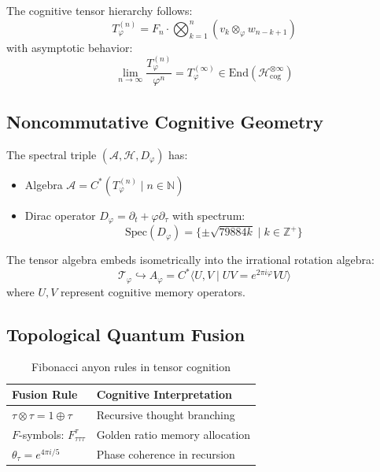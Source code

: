 \documentclass[12pt]{article}
\begin{document}
\begin{theorem}
The cognitive tensor hierarchy follows:
\[
T_\varphi^{(n)} = F_n \cdot \bigotimes_{k=1}^n \left(v_k \otimes_\varphi w_{n-k+1}\right)
\]
with asymptotic behavior:
\[
\lim_{n\to\infty} \frac{T_\varphi^{(n)}}{\varphi^n} = T_\varphi^{(\infty)} \in \text{End}(\mathcal{H}_{\text{cog}}^{\otimes \infty})
\]
\end{theorem}

\subsection{Noncommutative Cognitive Geometry}
The spectral triple $(\mathcal{A}, \mathcal{H}, D_\varphi)$ has:
\begin{itemize}
    \item Algebra $\mathcal{A} = C^*(T_\varphi^{(n)} \mid n \in \mathbb{N})$ 
    \item Dirac operator $D_\varphi = \partial_t + \varphi \partial_\tau$ with spectrum:
    \[
    \text{Spec}(D_\varphi) = \{ \pm \sqrt{79884k} \mid k \in \mathbb{Z}^+ \}
    \]
\end{itemize}

\begin{proposition}
The tensor algebra embeds isometrically into the irrational rotation algebra:
\[
\mathcal{T}_\varphi \hookrightarrow A_\varphi = C^*\langle U,V \mid UV = e^{2\pi i\varphi}VU \rangle
\]
where $U,V$ represent cognitive memory operators.
\end{proposition}

\subsection{Topological Quantum Fusion}
\begin{table}[h]
\centering
\begin{tabular}{ll}
\toprule
\textbf{Fusion Rule} & \textbf{Cognitive Interpretation} \\
\midrule
$\tau \otimes \tau = 1 \oplus \tau$ & Recursive thought branching \\
$F$-symbols: $F_{\tau\tau\tau}^\tau$ & Golden ratio memory allocation \\
$\theta_\tau = e^{4\pi i/5}$ & Phase coherence in recursion \\
\bottomrule
\end{tabular}
\caption{Fibonacci anyon rules in tensor cognition}
\end{table}
\end{document}
